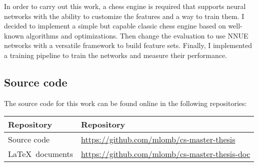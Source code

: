 In order to carry out this work, a chess engine is required that supports neural networks with the ability to customize the features and a way to train them. I decided to implement a simple but capable classic chess engine based on well-known algorithms and optimizations. Then change the evaluation to use NNUE networks with a versatile framework to build feature sets. Finally, I implemented a training pipeline to train the networks and measure their performance.

\subsection{Source code}

The source code for this work can be found online in the following repositories:

\begin{table}[H]
\centering
\begin{tabular}{ll}
\toprule
\textbf{Repository} & \textbf{Repository} \\
\midrule
Source code & \url{https://github.com/mlomb/cs-master-thesis} \\
\LaTeX\ documents & \url{https://github.com/mlomb/cs-master-thesis-doc}
\end{tabular}
\end{table}
